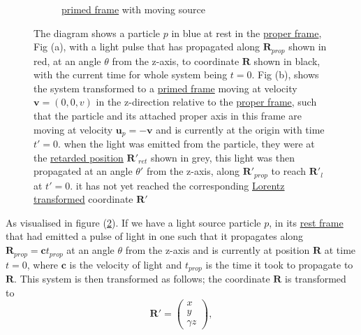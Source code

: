 \begin{figure}[ht]
\begin{subfigure}{.49\textwidth}
\caption{\hyperlink{def-Primed-Frame}{primed frame} with moving source}
\label{fig: primed frame 1}
\end{subfigure}
\caption{ The diagram shows a particle $p$ in blue at rest in the \protect\hyperlink{def-proper-frame}{proper frame}, Fig (a), with a light pulse that has propagated along $\mathbf{R}_{prop}$ shown in red, at an angle $\theta$ from the z-axis, to coordinate $\mathbf{R}$ shown in black, with the current time for whole system being $t=0$.
Fig (b), shows the system transformed to a \protect\hyperlink{def-Primed-Frame}{primed frame} moving at velocity $\mathbf{v}=(0,0,v)$ in the z-direction relative to the \protect\hyperlink{def-proper-frame}{proper frame}, such that the particle and its attached proper axis in this frame are moving at velocity $\mathbf{u}_p= - \mathbf{v}$ and is currently at the origin with time $t'=0$. when the light was emitted from the particle, they were at the \protect\hyperlink{def-retarded-position}{retarded position}  $\mathbf{R}'_{ret}$ shown in grey, this light was then propagated at an angle $\theta'$ from the z-axis, along $\mathbf{R}'_{prop}$ to reach $\mathbf{R}'_{l}$ at $t'=0$. it has not yet reached the corresponding \protect\hyperlink{def-lorentz-transform}{Lorentz transformed} coordinate $\mathbf{R}'$ }
\label{fig: Retarded field outward field transform}
\end{figure}



As visualised in figure (\ref{fig: Retarded field outward field transform}). If we have a light source particle $p$, in its \hyperlink{def-proper-frame}{rest frame} that had emitted a pulse of light in one such that it propagates along $\mathbf{R}_{prop}=\mathbf{c}t_{prop}$ at an angle $\theta$ from the z-axis and is currently at position $\mathbf{R}$ at time $t=0$, where $\mathbf{c}$ is the velocity of light and $t_{prop}$ is the time it took to propagate to $\mathbf{R}$.
This system is then transformed as follows; the coordinate $\mathbf{R}$ is transformed to 
\begin{equation}%
\label{displacement transform}
    \mathbf{R'} =   \begin{pmatrix}
    x\\ y \\ \gamma z
    \end{pmatrix},
\end{equation}%

